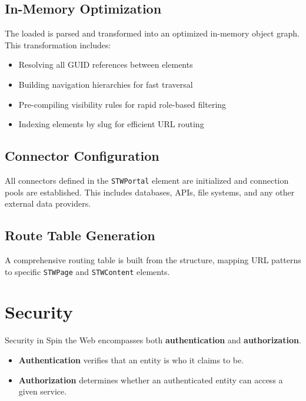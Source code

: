 \subsection{In-Memory Optimization}

The loaded \webbase{} is parsed and transformed into an optimized in-memory object graph. This transformation includes:

\begin{itemize}
	\item Resolving all GUID references between elements
	\item Building navigation hierarchies for fast traversal
	\item Pre-compiling visibility rules for rapid role-based filtering
	\item Indexing elements by slug for efficient URL routing
\end{itemize}

\subsection{Connector Configuration}

All connectors defined in the \texttt{STWPortal} element are initialized and connection pools are established. This includes databases, \rest{} APIs, file systems, and any other external data providers.

\subsection{Route Table Generation}

A comprehensive routing table is built from the \webbase{} structure, mapping URL patterns to specific \texttt{STWPage} and \texttt{STWContent} elements.

\section{Security}
\label{sec:security}

Security in Spin the Web encompasses both \textbf{authentication} and \textbf{authorization}.

\begin{itemize}
	\item \textbf{Authentication} verifies that an entity is who it claims to be.
	\item \textbf{Authorization} determines whether an authenticated entity can access a given service.
\end{itemize}

